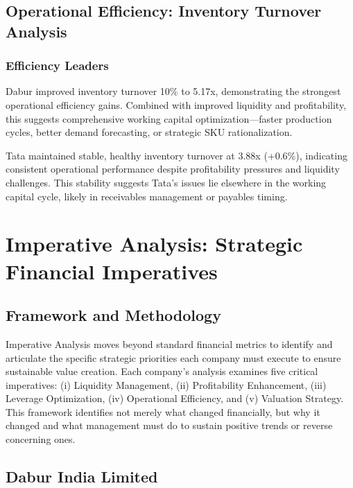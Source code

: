 \documentclass[12pt, a4paper]{report}
\begin{document}
\vspace{0.3cm}

\section{Operational Efficiency: Inventory Turnover Analysis}

\subsection{Efficiency Leaders}

Dabur improved inventory turnover 10\% to 5.17x, demonstrating the strongest operational efficiency gains. Combined with improved liquidity and profitability, this suggests comprehensive working capital optimization—faster production cycles, better demand forecasting, or strategic SKU rationalization.

Tata maintained stable, healthy inventory turnover at 3.88x (+0.6\%), indicating consistent operational performance despite profitability pressures and liquidity challenges. This stability suggests Tata's issues lie elsewhere in the working capital cycle, likely in receivables management or payables timing.

\newpage

\chapter{Imperative Analysis: Strategic Financial Imperatives}

\section{Framework and Methodology}

Imperative Analysis moves beyond standard financial metrics to identify and articulate the specific strategic priorities each company must execute to ensure sustainable value creation. Each company's analysis examines five critical imperatives: (i) Liquidity Management, (ii) Profitability Enhancement, (iii) Leverage Optimization, (iv) Operational Efficiency, and (v) Valuation Strategy. This framework identifies not merely what changed financially, but why it changed and what management must do to sustain positive trends or reverse concerning ones.

\section{Dabur India Limited}
\end{document}
